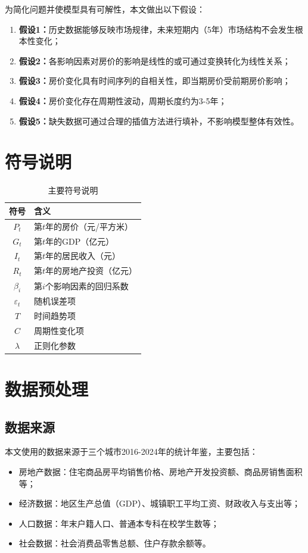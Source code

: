 \documentclass[12pt,a4paper]{article}
\begin{document}
为简化问题并使模型具有可解性，本文做出以下假设：

\begin{enumerate}
    \item \textbf{假设1：}历史数据能够反映市场规律，未来短期内（5年）市场结构不会发生根本性变化；
    \item \textbf{假设2：}各影响因素对房价的影响是线性的或可通过变换转化为线性关系；
    \item \textbf{假设3：}房价变化具有时间序列的自相关性，即当期房价受前期房价影响；
    \item \textbf{假设4：}房价变化存在周期性波动，周期长度约为3-5年；
    \item \textbf{假设5：}缺失数据可通过合理的插值方法进行填补，不影响模型整体有效性。
\end{enumerate}

\section{符号说明}

\begin{table}[H]
\centering
\caption{主要符号说明}
\begin{tabular}{cl}
\toprule
\textbf{符号} & \textbf{含义} \\
\midrule
$P_t$ & 第$t$年的房价（元/平方米） \\
$G_t$ & 第$t$年的GDP（亿元） \\
$I_t$ & 第$t$年的居民收入（元） \\
$R_t$ & 第$t$年的房地产投资（亿元） \\
$\beta_i$ & 第$i$个影响因素的回归系数 \\
$\varepsilon_t$ & 随机误差项 \\
$T$ & 时间趋势项 \\
$C$ & 周期性变化项 \\
$\lambda$ & 正则化参数 \\
\bottomrule
\end{tabular}
\end{table}

\section{数据预处理}

\subsection{数据来源}
本文使用的数据来源于三个城市2016-2024年的统计年鉴，主要包括：
\begin{itemize}
    \item 房地产数据：住宅商品房平均销售价格、房地产开发投资额、商品房销售面积等；
    \item 经济数据：地区生产总值（GDP）、城镇职工平均工资、财政收入与支出等；
    \item 人口数据：年末户籍人口、普通本专科在校学生数等；
    \item 社会数据：社会消费品零售总额、住户存款余额等。
\end{itemize}
\end{document}
